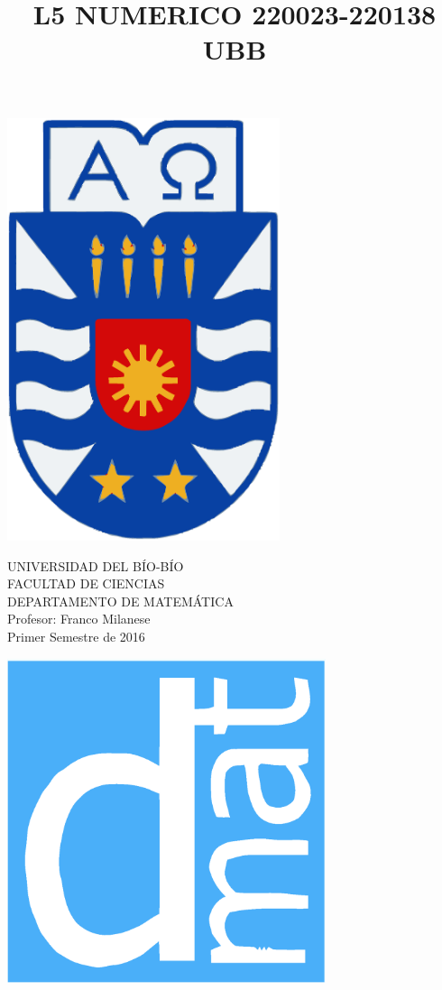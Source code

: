 \documentclass[11pt]{article}
\begin{document}
\title{L5 NUMERICO 220023-220138 UBB}

{\begin{minipage}{2cm}
\hspace*{1cm}\includegraphics[width=0.6\textwidth]{escubo-ubb.eps}
\end{minipage}
\begin{minipage}{12cm}
\small
{\bf \rm 
{
\begin{center}
{\footnotesize UNIVERSIDAD DEL B\'IO-B\'IO} \\
{\scriptsize FACULTAD DE CIENCIAS}  \\
{\scriptsize DEPARTAMENTO DE MATEM\'ATICA}  \\
{\scriptsize Profesor:  Franco Milanese}\\
{\scriptsize Primer Semestre de 2016}
\end{center}
}}
\end{minipage}}
{\begin{minipage}{2cm}
\hspace*{-0.5cm}\vspace*{-0.05cm}\includegraphics[width=0.7\textwidth]{escudo-dmat.eps}
\end{minipage}}
\end{document}
